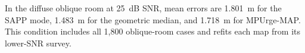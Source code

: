 In the diffuse oblique room at 25~dB SNR, mean errors are 1.801~m for the SAPP mode, 1.483~m for the geometric median, and 1.718~m for MPUrge-MAP. This condition includes all 1,800 oblique-room cases and refits each map from its lower-SNR survey.
